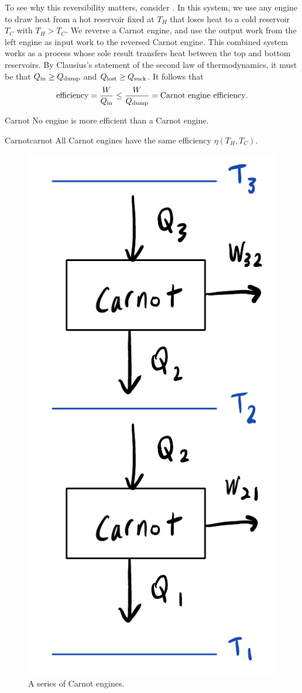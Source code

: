 To see why this reversibility matters, consider . In this
system, we use any engine to draw heat from a hot reservoir fixed at
$T_H$ that loses heat to a cold reservoir $T_C$ with $T_H>T_C$. We reverse a Carnot engine,
and use the output work from the left engine as input work to the reversed
Carnot engine. This combined system works as a process whose sole result 
transfers heat between the top and bottom reservoirs. By Clausius's statement 
of the second law of thermodynamics, it must be that $Q_{\text{in}}\geq Q_{\text{dump}}$ and
$Q_{\text{lost}}\geq Q_{\text{suck}}$. It follows that
\begin{equation}
\text{efficiency}=\frac{W}{Q_{\text{in}}}\leq\frac{W}{Q_{\text{dump}}}=\text{Carnot engine
efficiency}.
\end{equation}

\begin{theorem}{Carnot}{}
No engine is more efficient than a Carnot engine.
\end{theorem}

\begin{corollary}{Carnot}{carnot}
All Carnot engines have the same efficiency $\eta(T_H,T_C).$
\end{corollary}

\begin{figure}
\centering
\includegraphics[width=0.4\linewidth]{figs/carnotSeries.pdf}
\caption{A series of Carnot engines.}
\label{fig:carnotSeries}
\end{figure}

